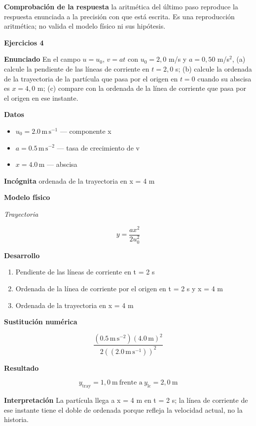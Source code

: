 \documentclass[10pt,openany]{book}
\begin{document}
\noindent\textbf{Comprobación de la respuesta} la aritmética del último paso reproduce la respuesta enunciada a la precisión con que está escrita. Es una reproducción aritmética; no valida el modelo físico ni sus hipótesis.

\noindent\textbf{Ejercicios 4}

\noindent\textbf{Enunciado}
En el campo \(u = u_0\), \(v = at\) con \(u_0 = 2{,}0\) m/s y \(a = 0{,}50\) m/s\(^2\), (a) calcule la pendiente de las líneas de corriente en \(t = 2{,}0\) s; (b) calcule la ordenada de la trayectoria de la partícula que pasa por el origen en \(t = 0\) cuando su abscisa es \(x = 4{,}0\) m; (c) compare con la ordenada de la línea de corriente que pasa por el origen en ese instante.

\noindent\textbf{Datos}
\begin{itemize}
\item $u_{0} = 2.0\,\mathrm{m}\,\mathrm{s}^{-1}$ — componente x
\item $a = 0.5\,\mathrm{m}\,\mathrm{s}^{-2}$ — tasa de crecimiento de v
\item $x = 4.0\,\mathrm{m}$ — abscisa
\end{itemize}

\noindent\textbf{Incógnita}
ordenada de la trayectoria en x = 4 m

\noindent\textbf{Modelo físico}

\noindent\textit{Trayectoria}

\[
y = \frac{a x^{2}}{2 u_0^{2}}
\]

\noindent\textbf{Desarrollo}
\begin{enumerate}
\item
Pendiente de las líneas de corriente en t = 2 s
\item
Ordenada de la línea de corriente por el origen en t = 2 s y x = 4 m
\item
Ordenada de la trayectoria en x = 4 m
\end{enumerate}

\noindent\textbf{Sustitución numérica}

\[
\frac{\left(0.5\,\mathrm{m}\,\mathrm{s}^{-2}\right) \left(4.0\,\mathrm{m}\right)^{2}}{2 \left(\left(2.0\,\mathrm{m}\,\mathrm{s}^{-1}\right)\right)^{2}}
\]

\noindent\textbf{Resultado}

\[
y_{\mathrm{tray}} = 1{,}0\ \mathrm{m}\ \text{frente a}\ y_{\mathrm{lc}} = 2{,}0\ \mathrm{m}
\]

\noindent\textbf{Interpretación}
La partícula llega a x = 4 m en t = 2 s; la línea de corriente de ese instante tiene el doble de ordenada porque refleja la velocidad actual, no la historia.
\end{document}
